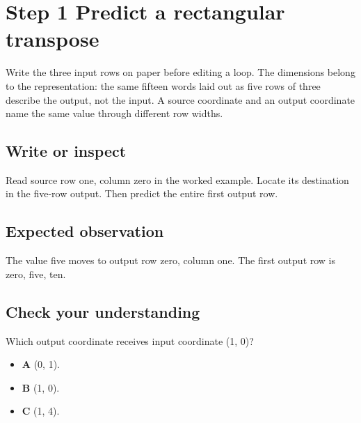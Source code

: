 \section{Step 1 Predict a rectangular transpose}\label{transpose-s01}

Write the three input rows on paper before editing a loop. The dimensions belong to the representation: the same fifteen words laid out as five rows of three describe the output, not the input. A source coordinate and an output coordinate name the same value through different row widths.

\subsection{Write or inspect}
Read source row one, column zero in the worked example. Locate its destination in the five-row output. Then predict the entire first output row.

\subsection{Expected observation}
The value five moves to output row zero, column one. The first output row is zero, five, ten.

\subsection{Check your understanding}
Which output coordinate receives input coordinate (1, 0)?

\begin{itemize}
  \item \textbf{A} (0, 1).
  \item \textbf{B} (1, 0).
  \item \textbf{C} (1, 4).
\end{itemize}
